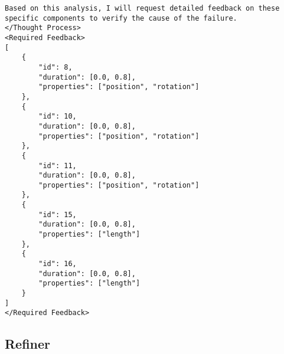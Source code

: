 \begin{lstlisting}
Based on this analysis, I will request detailed feedback on these specific components to verify the cause of the failure.
</Thought Process>
<Required Feedback>
[
    {
        "id": 8,
        "duration": [0.0, 0.8],
        "properties": ["position", "rotation"]
    },
    {
        "id": 10,
        "duration": [0.0, 0.8],
        "properties": ["position", "rotation"]
    },
    {
        "id": 11,
        "duration": [0.0, 0.8],
        "properties": ["position", "rotation"]
    },
    {
        "id": 15,
        "duration": [0.0, 0.8],
        "properties": ["length"]
    },
    {
        "id": 16,
        "duration": [0.0, 0.8],
        "properties": ["length"]
    }
]
</Required Feedback>
\end{lstlisting}

\subsection{Refiner}
